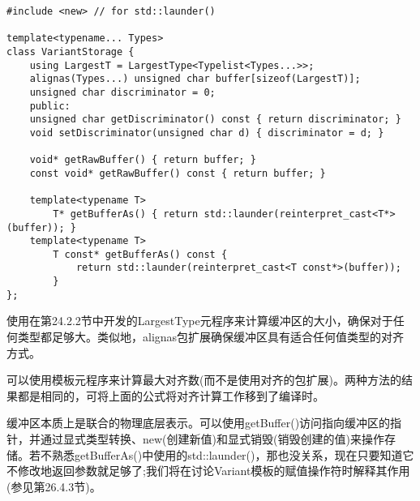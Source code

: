 \begin{lstlisting}[style=styleCXX]
#include <new> // for std::launder()

template<typename... Types>
class VariantStorage {
	using LargestT = LargestType<Typelist<Types...>>;
	alignas(Types...) unsigned char buffer[sizeof(LargestT)];
	unsigned char discriminator = 0;
	public:
	unsigned char getDiscriminator() const { return discriminator; }
	void setDiscriminator(unsigned char d) { discriminator = d; }
	
	void* getRawBuffer() { return buffer; }
	const void* getRawBuffer() const { return buffer; }
	
	template<typename T>
		T* getBufferAs() { return std::launder(reinterpret_cast<T*>(buffer)); }
	template<typename T>
		T const* getBufferAs() const {
			return std::launder(reinterpret_cast<T const*>(buffer));
		}
};
\end{lstlisting}

使用在第24.2.2节中开发的LargestType元程序来计算缓冲区的大小，确保对于任何类型都足够大。类似地，alignas包扩展确保缓冲区具有适合任何值类型的对齐方式。

\begin{tcolorbox}[colback=webgreen!5!white,colframe=webgreen!75!black]
\hspace*{0.75cm}可以使用模板元程序来计算最大对齐数(而不是使用对齐的包扩展)。两种方法的结果都是相同的，可将上面的公式将对齐计算工作移到了编译时。
\end{tcolorbox}

缓冲区本质上是联合的物理底层表示。可以使用getBuffer()访问指向缓冲区的指针，并通过显式类型转换、new(创建新值)和显式销毁(销毁创建的值)来操作存储。若不熟悉getBufferAs()中使用的std::launder()，那也没关系，现在只要知道它不修改地返回参数就足够了;我们将在讨论Variant模板的赋值操作符时解释其作用(参见第26.4.3节)。






































